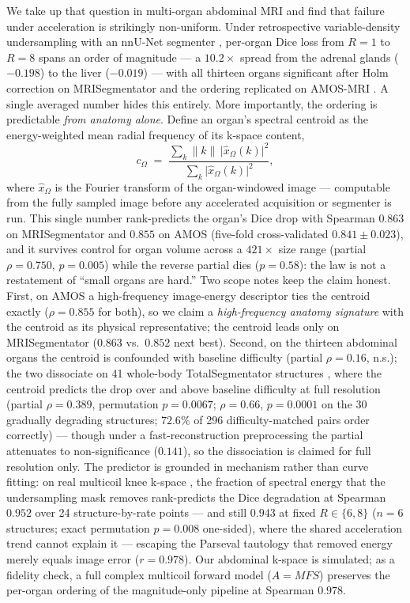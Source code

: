 \documentclass[10pt,twocolumn,letterpaper]{article}
\begin{document}
We take up that question in multi-organ abdominal MRI and find that failure under acceleration is strikingly non-uniform. Under retrospective variable-density undersampling with an nnU-Net segmenter \cite{isensee2021}, per-organ Dice loss from $R{=}1$ to $R{=}8$ spans an order of magnitude --- a $10.2\times$ spread from the adrenal glands ($-0.198$) to the liver ($-0.019$) --- with all thirteen organs significant after Holm correction on MRISegmentator \cite{mrisegmentator2024} and the ordering replicated on AMOS-MRI \cite{amos2022}. A single averaged number hides this entirely. More importantly, the ordering is predictable \emph{from anatomy alone}. Define an organ's spectral centroid as the energy-weighted mean radial frequency of its k-space content,
\begin{equation}
  c_\Omega \;=\; \frac{\sum_{k} \lVert k \rVert \,\bigl|\hat{x}_\Omega(k)\bigr|^{2}}{\sum_{k} \bigl|\hat{x}_\Omega(k)\bigr|^{2}},
  \label{eq:centroid}
\end{equation}
where $\hat{x}_\Omega$ is the Fourier transform of the organ-windowed image --- computable from the fully sampled image before any accelerated acquisition or segmenter is run. This single number rank-predicts the organ's Dice drop with Spearman $0.863$ on MRISegmentator and $0.855$ on AMOS (five-fold cross-validated $0.841\pm0.023$), and it survives control for organ volume across a $421\times$ size range (partial $\rho{=}0.750$, $p{=}0.005$) while the reverse partial dies ($p{=}0.58$): the law is not a restatement of ``small organs are hard.'' Two scope notes keep the claim honest. First, on AMOS a high-frequency image-energy descriptor ties the centroid exactly ($\rho{=}0.855$ for both), so we claim a \emph{high-frequency anatomy signature} with the centroid as its physical representative; the centroid leads only on MRISegmentator ($0.863$ vs.\ $0.852$ next best). Second, on the thirteen abdominal organs the centroid is confounded with baseline difficulty (partial $\rho{=}0.16$, n.s.); the two dissociate on 41 whole-body TotalSegmentator structures \cite{wasserthal2023totalseg}, where the centroid predicts the drop over and above baseline difficulty at full resolution (partial $\rho{=}0.389$, permutation $p{=}0.0067$; $\rho{=}0.66$, $p{=}0.0001$ on the 30 gradually degrading structures; $72.6\%$ of 296 difficulty-matched pairs order correctly) --- though under a fast-reconstruction preprocessing the partial attenuates to non-significance ($0.141$), so the dissociation is claimed for full resolution only. The predictor is grounded in mechanism rather than curve fitting: on real multicoil knee k-space \cite{desai2022skmtea}, the fraction of spectral energy that the undersampling mask removes rank-predicts the Dice degradation at Spearman $0.952$ over 24 structure-by-rate points --- and still $0.943$ at fixed $R\in\{6,8\}$ ($n{=}6$ structures; exact permutation $p{=}0.008$ one-sided), where the shared acceleration trend cannot explain it --- escaping the Parseval tautology that removed energy merely equals image error ($r{=}0.978$). Our abdominal k-space is simulated; as a fidelity check, a full complex multicoil forward model ($A = M F S$) preserves the per-organ ordering of the magnitude-only pipeline at Spearman $0.978$.
\end{document}
